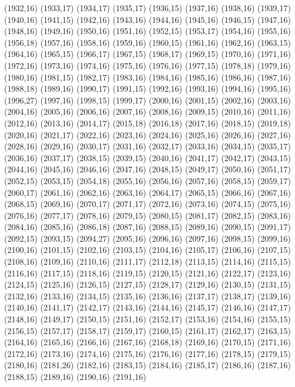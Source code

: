 (1932,16)
(1933,17)
(1934,17)
(1935,17)
(1936,15)
(1937,16)
(1938,16)
(1939,17)
(1940,16)
(1941,15)
(1942,16)
(1943,16)
(1944,16)
(1945,16)
(1946,15)
(1947,16)
(1948,16)
(1949,16)
(1950,16)
(1951,16)
(1952,15)
(1953,17)
(1954,16)
(1955,16)
(1956,18)
(1957,16)
(1958,16)
(1959,16)
(1960,15)
(1961,16)
(1962,16)
(1963,15)
(1964,16)
(1965,15)
(1966,17)
(1967,15)
(1968,17)
(1969,15)
(1970,16)
(1971,16)
(1972,16)
(1973,16)
(1974,16)
(1975,16)
(1976,16)
(1977,15)
(1978,18)
(1979,16)
(1980,16)
(1981,15)
(1982,17)
(1983,16)
(1984,16)
(1985,16)
(1986,16)
(1987,16)
(1988,18)
(1989,16)
(1990,17)
(1991,15)
(1992,16)
(1993,16)
(1994,16)
(1995,16)
(1996,27)
(1997,16)
(1998,15)
(1999,17)
(2000,16)
(2001,15)
(2002,16)
(2003,16)
(2004,16)
(2005,16)
(2006,16)
(2007,16)
(2008,16)
(2009,15)
(2010,16)
(2011,16)
(2012,16)
(2013,16)
(2014,17)
(2015,18)
(2016,18)
(2017,16)
(2018,15)
(2019,18)
(2020,16)
(2021,17)
(2022,16)
(2023,16)
(2024,16)
(2025,16)
(2026,16)
(2027,16)
(2028,16)
(2029,16)
(2030,17)
(2031,16)
(2032,17)
(2033,16)
(2034,15)
(2035,17)
(2036,16)
(2037,17)
(2038,15)
(2039,15)
(2040,16)
(2041,17)
(2042,17)
(2043,15)
(2044,16)
(2045,16)
(2046,16)
(2047,16)
(2048,15)
(2049,17)
(2050,16)
(2051,17)
(2052,15)
(2053,15)
(2054,18)
(2055,16)
(2056,16)
(2057,16)
(2058,15)
(2059,17)
(2060,17)
(2061,16)
(2062,16)
(2063,16)
(2064,17)
(2065,15)
(2066,16)
(2067,16)
(2068,15)
(2069,16)
(2070,17)
(2071,17)
(2072,16)
(2073,16)
(2074,15)
(2075,16)
(2076,16)
(2077,17)
(2078,16)
(2079,15)
(2080,15)
(2081,17)
(2082,15)
(2083,16)
(2084,16)
(2085,16)
(2086,18)
(2087,16)
(2088,15)
(2089,16)
(2090,15)
(2091,17)
(2092,15)
(2093,15)
(2094,27)
(2095,16)
(2096,16)
(2097,16)
(2098,15)
(2099,16)
(2100,16)
(2101,15)
(2102,16)
(2103,15)
(2104,16)
(2105,17)
(2106,16)
(2107,15)
(2108,16)
(2109,16)
(2110,16)
(2111,17)
(2112,18)
(2113,15)
(2114,16)
(2115,15)
(2116,16)
(2117,15)
(2118,16)
(2119,15)
(2120,15)
(2121,16)
(2122,17)
(2123,16)
(2124,15)
(2125,16)
(2126,15)
(2127,15)
(2128,17)
(2129,16)
(2130,15)
(2131,15)
(2132,16)
(2133,16)
(2134,15)
(2135,16)
(2136,16)
(2137,17)
(2138,17)
(2139,16)
(2140,16)
(2141,17)
(2142,17)
(2143,16)
(2144,16)
(2145,17)
(2146,16)
(2147,17)
(2148,16)
(2149,17)
(2150,15)
(2151,16)
(2152,17)
(2153,16)
(2154,16)
(2155,15)
(2156,15)
(2157,17)
(2158,17)
(2159,17)
(2160,15)
(2161,17)
(2162,17)
(2163,15)
(2164,16)
(2165,16)
(2166,16)
(2167,16)
(2168,18)
(2169,16)
(2170,15)
(2171,16)
(2172,16)
(2173,16)
(2174,16)
(2175,16)
(2176,16)
(2177,16)
(2178,15)
(2179,15)
(2180,16)
(2181,26)
(2182,16)
(2183,15)
(2184,16)
(2185,17)
(2186,16)
(2187,16)
(2188,15)
(2189,16)
(2190,16)
(2191,16)
